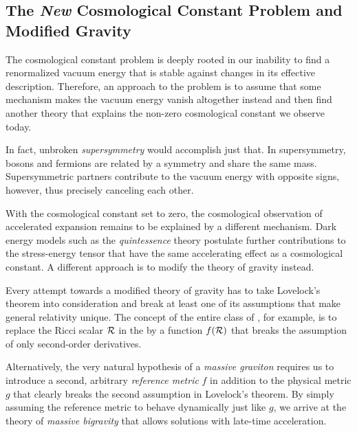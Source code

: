 \documentclass[parskip=half]{scrreprt}
\begin{document}

\subsection{The \emph{New} Cosmological Constant Problem and Modified Gravity}\label{sec:new_cc_problem}

The cosmological constant problem is deeply rooted in our inability to find a renormalized vacuum energy that is stable against changes in its effective description. Therefore, an approach to the problem is to assume that some mechanism makes the vacuum energy vanish altogether instead and then find another theory that explains the non-zero cosmological constant we observe today.

In fact, unbroken \emph{supersymmetry} would accomplish just that. In supersymmetry, bosons and fermions are related by a symmetry and share the same mass. Supersymmetric partners contribute to the vacuum energy with opposite signs, however, thus precisely canceling each other.

With the cosmological constant set to zero, the cosmological observation of accelerated expansion  remains to be explained by a different mechanism. Dark energy models such as the \emph{quintessence} theory  postulate further contributions to the stress-energy tensor that have the same accelerating effect as a cosmological constant. A different approach is to modify the theory of gravity instead.

Every attempt towards a modified theory of gravity has to take Lovelock's theorem into consideration and break at least one of its assumptions that make general relativity unique. The concept of the entire class of \emph{}, for example, is to replace the Ricci scalar \(\mathcal{R}\) in the  by a function \(f(\mathcal{R})\) that breaks the assumption of only second-order derivatives.

Alternatively, the very natural hypothesis of a \emph{massive graviton} requires us to introduce a second, arbitrary \emph{reference metric} \(f\) in addition to the physical metric \(g\)  that clearly breaks the second assumption in Lovelock's theorem. By simply assuming the reference metric to behave dynamically just like \(g\), we arrive at the theory of \emph{massive bigravity} that allows solutions with late-time acceleration. 
\end{document}
